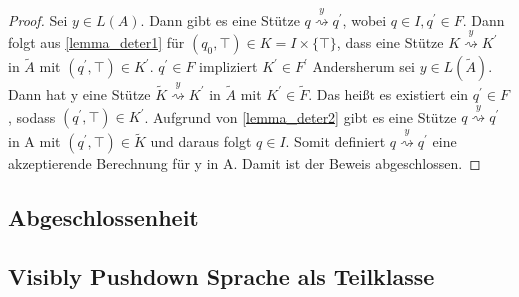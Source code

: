 \begin{proof}
Sei $y \in L(A)$. Dann gibt es eine Stütze $q \stackrel{y} {\rightsquigarrow} q^\prime$, wobei $q\in I, q^\prime \in F$. Dann folgt aus \autoref{lemma_deter1} für $(q_0, \top) \in K=I \times \{\top\}$, dass eine Stütze $K \stackrel{y}{\rightsquigarrow}K^\prime$ in $\tilde{A}$ mit $(q^\prime, \top) \in K^\prime $. $q^\prime \in F$ impliziert $K^\prime \in F^\prime$
Andersherum sei $y \in L(\tilde{A})$. Dann hat y eine Stütze $\tilde{K}\stackrel{y}{\rightsquigarrow}K^\prime$ in $\tilde{A}$ mit $K^\prime \in \tilde{F}$. Das heißt es existiert ein $q^\prime \in F$, sodass $(q^\prime, \top) \in K^\prime$. Aufgrund von \autoref{lemma_deter2} gibt es eine Stütze $q \stackrel{y} {\rightsquigarrow} q^\prime$ in A mit $(q^\prime, \top) \in \tilde{K}$ und daraus folgt $q \in I$. Somit definiert $q\stackrel{y}{\rightsquigarrow}q^\prime$ eine akzeptierende Berechnung für y in A.
Damit ist der Beweis abgeschlossen. 
\end{proof}
\subsection{Abgeschlossenheit}

\subsection{Visibly Pushdown Sprache als Teilklasse}